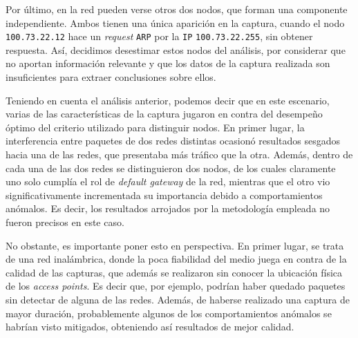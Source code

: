 Por último, en la red pueden verse otros dos nodos, que forman una componente
independiente. Ambos tienen una única aparición en la captura, cuando el
nodo \texttt{100.73.22.12} hace un \emph{request} \texttt{ARP} por la
\texttt{IP} \texttt{100.73.22.255}, sin obtener respuesta. Así, decidimos
desestimar estos nodos del análisis, por considerar que no aportan información
relevante y que los datos de la captura realizada son insuficientes para
extraer conclusiones sobre ellos.

Teniendo en cuenta el análisis anterior, podemos decir que en este escenario,
varias de las características de la captura jugaron en contra del desempeño
óptimo del criterio utilizado para distinguir nodos. En primer lugar, la
interferencia entre paquetes de dos redes distintas ocasionó resultados
sesgados hacia una de las redes, que presentaba más tráfico que la otra.
Además, dentro de cada una de las dos redes se distinguieron dos nodos, de
los cuales claramente uno solo cumplía el rol de \emph{default gateway} de
la red, mientras que el otro vio significativamente incrementada su
importancia debido a comportamientos anómalos. Es decir, los resultados
arrojados por la metodología empleada no fueron precisos en este caso.

No obstante, es importante poner esto en perspectiva. En primer lugar, se
trata de una red inalámbrica, donde la poca fiabilidad del medio juega en
contra de la calidad de las capturas, que además se realizaron sin conocer la
ubicación física de los \emph{access points}. Es decir que, por ejemplo,
podrían haber quedado paquetes sin detectar de alguna de las redes. Además, de
haberse realizado una captura de mayor duración, probablemente algunos de los
comportamientos anómalos se habrían visto mitigados, obteniendo así resultados
de mejor calidad.
